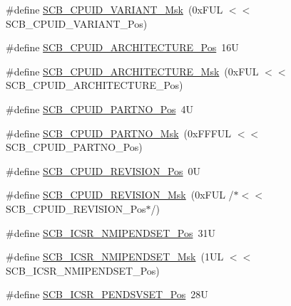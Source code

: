 \begin{DoxyCompactItemize}
\item 
\#define \mbox{\hyperlink{group___c_m_s_i_s___s_c_b_gad358dfbd04300afc1824329d128b99e8}{S\+C\+B\+\_\+\+C\+P\+U\+I\+D\+\_\+\+V\+A\+R\+I\+A\+N\+T\+\_\+\+Msk}}~(0x\+F\+U\+L $<$$<$ S\+C\+B\+\_\+\+C\+P\+U\+I\+D\+\_\+\+V\+A\+R\+I\+A\+N\+T\+\_\+\+Pos)
\item 
\#define \mbox{\hyperlink{group___c_m_s_i_s___s_c_b_gaf8b3236b08fb8e840efb682645fb0e98}{S\+C\+B\+\_\+\+C\+P\+U\+I\+D\+\_\+\+A\+R\+C\+H\+I\+T\+E\+C\+T\+U\+R\+E\+\_\+\+Pos}}~16U
\item 
\#define \mbox{\hyperlink{group___c_m_s_i_s___s_c_b_gafae4a1f27a927338ae9dc51a0e146213}{S\+C\+B\+\_\+\+C\+P\+U\+I\+D\+\_\+\+A\+R\+C\+H\+I\+T\+E\+C\+T\+U\+R\+E\+\_\+\+Msk}}~(0x\+F\+U\+L $<$$<$ S\+C\+B\+\_\+\+C\+P\+U\+I\+D\+\_\+\+A\+R\+C\+H\+I\+T\+E\+C\+T\+U\+R\+E\+\_\+\+Pos)
\item 
\#define \mbox{\hyperlink{group___c_m_s_i_s___s_c_b_ga705f68eaa9afb042ca2407dc4e4629ac}{S\+C\+B\+\_\+\+C\+P\+U\+I\+D\+\_\+\+P\+A\+R\+T\+N\+O\+\_\+\+Pos}}~4U
\item 
\#define \mbox{\hyperlink{group___c_m_s_i_s___s_c_b_ga98e581423ca016680c238c469aba546d}{S\+C\+B\+\_\+\+C\+P\+U\+I\+D\+\_\+\+P\+A\+R\+T\+N\+O\+\_\+\+Msk}}~(0x\+F\+F\+F\+U\+L $<$$<$ S\+C\+B\+\_\+\+C\+P\+U\+I\+D\+\_\+\+P\+A\+R\+T\+N\+O\+\_\+\+Pos)
\item 
\#define \mbox{\hyperlink{group___c_m_s_i_s___s_c_b_ga3c3d9071e574de11fb27ba57034838b1}{S\+C\+B\+\_\+\+C\+P\+U\+I\+D\+\_\+\+R\+E\+V\+I\+S\+I\+O\+N\+\_\+\+Pos}}~0U
\item 
\#define \mbox{\hyperlink{group___c_m_s_i_s___s_c_b_ga2ec0448b6483f77e7f5d08b4b81d85df}{S\+C\+B\+\_\+\+C\+P\+U\+I\+D\+\_\+\+R\+E\+V\+I\+S\+I\+O\+N\+\_\+\+Msk}}~(0x\+F\+U\+L /$\ast$$<$$<$ S\+C\+B\+\_\+\+C\+P\+U\+I\+D\+\_\+\+R\+E\+V\+I\+S\+I\+O\+N\+\_\+\+Pos$\ast$/)
\item 
\#define \mbox{\hyperlink{group___c_m_s_i_s___s_c_b_ga750d4b52624a46d71356db4ea769573b}{S\+C\+B\+\_\+\+I\+C\+S\+R\+\_\+\+N\+M\+I\+P\+E\+N\+D\+S\+E\+T\+\_\+\+Pos}}~31U
\item 
\#define \mbox{\hyperlink{group___c_m_s_i_s___s_c_b_ga340e3f79e9c3607dee9f2c048b6b22e8}{S\+C\+B\+\_\+\+I\+C\+S\+R\+\_\+\+N\+M\+I\+P\+E\+N\+D\+S\+E\+T\+\_\+\+Msk}}~(1\+U\+L $<$$<$ S\+C\+B\+\_\+\+I\+C\+S\+R\+\_\+\+N\+M\+I\+P\+E\+N\+D\+S\+E\+T\+\_\+\+Pos)
\item 
\#define \mbox{\hyperlink{group___c_m_s_i_s___s_c_b_gab5ded23d2ab1d5ff7cc7ce746205e9fe}{S\+C\+B\+\_\+\+I\+C\+S\+R\+\_\+\+P\+E\+N\+D\+S\+V\+S\+E\+T\+\_\+\+Pos}}~28U
\item 

\end{DoxyCompactItemize}
